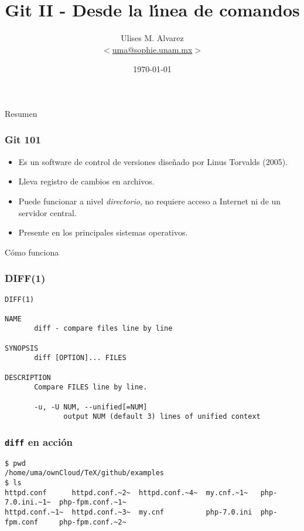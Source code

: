 \documentclass{beamer}
\title{Git II - Desde la l\'\i{}nea de comandos}
\date{\today}
\author{Ulises M. Alvarez\\ %
   $<$\href{mailto:uma@sophie.unam.mx}%
   {uma@sophie.unam.mx}$>$
}
\institute{Sophie UNAM}
\begin{document}
\maketitle



\begin{frame}[standout]
  Resumen
\end{frame}

\begin{frame}
  \frametitle{Git 101}
  \begin{itemize}
  \item Es un software de control de versiones diseñado por Linus
    Torvalds (2005).
  \item Lleva registro de cambios en archivos.
  \item Puede funcionar a nivel \textit{directorio}, no requiere
    acceso a Internet ni de un servidor central.
  \item Presente en los principales sistemas operativos.
  \end{itemize}
\end{frame}

\begin{frame}[standout]
  C\'omo funciona
\end{frame}

\begin{frame}[fragile]
  \frametitle{DIFF(1)}
\begin{verbatim}
DIFF(1) 

NAME
       diff - compare files line by line

SYNOPSIS
       diff [OPTION]... FILES

DESCRIPTION
       Compare FILES line by line.

       -u, -U NUM, --unified[=NUM]
              output NUM (default 3) lines of unified context
\end{verbatim}  
\end{frame}

\begin{frame}[fragile]
  \frametitle{\texttt{diff} en acci\'on}
\begin{verbatim}
$ pwd
/home/uma/ownCloud/TeX/github/examples
$ ls
httpd.conf      httpd.conf.~2~  httpd.conf.~4~  my.cnf.~1~   php-7.0.ini.~1~  php-fpm.conf.~1~
httpd.conf.~1~  httpd.conf.~3~  my.cnf          php-7.0.ini  php-fpm.conf     php-fpm.conf.~2~
\end{verbatim}
\end{frame}
\end{document}
